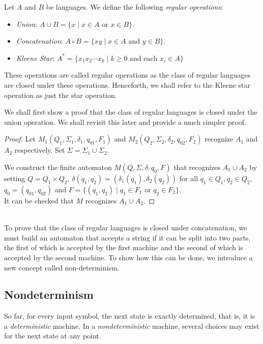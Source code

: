 \begin{definition}
Let $A$ and $B$ be languages. We define the following \textit{regular operations}:
\begin{itemize}
	\item \textit{Union}: $A\cup B=\{x\mid x\in A \text{ or }x\in B\}$.
	\item \textit{Concatenation}: $A\circ B=\{xy\mid x\in A\text{ and }y\in B\}$.
	\item \textit{Kleene Star}: $A^*=\{x_1x_2\cdots x_k\mid k\geq 0\text{ and each }x_i\in A\}$
\end{itemize}
\end{definition}

These operations are called regular operations as the class of regular languages are closed under these operations. Henceforth, we shall refer to the Kleene star operation as just the star operation.

\vspace{2mm}
We shall first show a proof that the class of regular languages is closed under the union operation. We shall revisit this later and provide a much simpler proof.
\begin{proof}
Let $M_1(Q_1,\Sigma_1,\delta_1,q_{01},F_1)$ and $M_2(Q_2,\Sigma_2,\delta_2,q_{02},F_2)$ recognize $A_1$ and $A_2$ respectively. Set $\Sigma=\Sigma_1\cup\Sigma_2$.

We construct the finite automaton $M(Q,\Sigma,\delta,q_0,F)$ that recognizes $A_1\cup A_2$ by setting $Q=Q_1\times Q_2$, $\delta(q_1, q_2)=(\delta_1(q_1), \delta_2(q_2))$ for all $q_1\in Q_1,q_2\in Q_2$, $q_0=(q_{01}, q_{02})$ and $F=\{(q_1, q_2)\mid q_1\in F_1 \text{ or }q_2\in F_2\}$.\\
It can be checked that $M$ recognizes $A_1\cup A_2$.
\end{proof}
~\\
To prove that the class of regular languages is closed under concatenation, we must build an automaton that accepts a string if it can be split into two parts, the first of which is accepted by the first machine and the second of which is accepted by the second machine. To show how this can be done, we introduce a new concept called non-determinism.
\clearpage

\subsection{Nondeterminism}

So far, for every input symbol, the next state is exactly determined, that is, it is a \textit{deterministic} machine. In a \textit{nondeterministic} machine, several choices may exist for the next state at any point.

